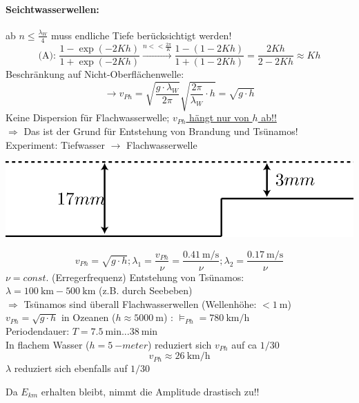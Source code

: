 \paragraph{Seichtwasserwellen:}
ab $  n \leq \frac{\lambda_W}{4} $ muss endliche Tiefe berücksichtigt werden!\\
$$\text{(A): } \frac{1-\exp(-2Kh)}{1+\exp(-2Kh)} \overset{n<<\frac{2\pi}{K}}{\longrightarrow} \frac{1-(1-2Kh)}{1+(1-2Kh)} = \frac{2Kh}{2-2Kh} \approx Kh$$
Beschränkung auf Nicht-Oberflächenwelle:\\
$$ \rightarrow v_{Ph} = \sqrt{\frac{g\cdot\lambda_W}{2\pi}} \sqrt{\frac{2\pi}{\lambda_W}\cdot h} = \sqrt{g \cdot h} $$
Keine Dispersion für Flachwasserwelle; \underline{$ v_{Ph}  $ hängt nur von $ h $ ab!!}\\
$ \Rightarrow $ Das ist der Grund für Entstehung von Brandung und Tsünamos!\\
Experiment: Tiefwasser $ \rightarrow $ Flachwasserwelle\\
\begin{center}
	\includegraphics[width=0.5\linewidth]{skizzen/19/19B28}
\end{center}
$$ v_{Ph}  = \sqrt{g\cdot h}; \lambda_1 = \frac{v_{Ph}}{\nu} = \frac{\SI{0,41}{\meter\per\second}}{\nu}; \lambda_2 = \frac{\SI{0,17}{\meter\per\second}}{\nu} $$
$ \nu  = const.$ (Erregerfrequenz)
Entstehung von Tsünamos:\\
$ \lambda=\SI{100}{\kilo\meter} - \SI{500}{\kilo\meter} $ (z.B. durch Seebeben)\\
$ \Rightarrow $ Tsünamos sind überall Flachwasserwellen (Wellenhöhe: $ <\SI{1}{\meter} $)\\
$ v_{Ph} = \sqrt{g\cdot h} $ in Ozeanen ($ h \approx \SI{5000}{\meter} $) : $ \vDash_{Ph} =\SI{780}{\kilo\meter\per\hour} $\\
Periodendauer: $ T=\SI{7,5}{\minute} ... \SI{38}{\minute} $\\
In flachem Wasser ($ h=\SI{5}{-meter} $) reduziert sich $ v_{Ph}  $ auf ca $ 1/30 $
$$ v_{Ph}  \approx \SI{26}{\kilo\meter\per\hour}$$
$ \lambda $ reduziert sich ebenfalls auf $ 1/30 $
\begin{tcolorbox} [colback = {White}, outer arc=0mm, sharp corners]
	Da $ E_{km} $ erhalten bleibt, nimmt die Amplitude drastisch zu!!
\end{tcolorbox}
